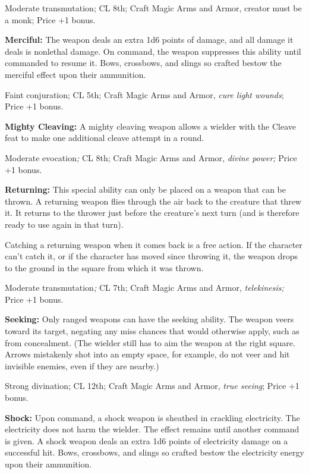 \documentclass{article}
\begin{document}
Moderate transmutation; CL 8th; Craft Magic Arms and Armor, creator must be a monk; 
Price +1 bonus.

\textbf{Merciful: }The weapon deals an extra 1d6 points of damage, and all damage 
it deals is nonlethal damage. On command, the weapon suppresses this ability until 
commanded to resume it. Bows, crossbows, and slings so crafted bestow the merciful 
effect upon their ammunition.

Faint conjuration; CL 5th; Craft Magic Arms and Armor, \textit{cure light wounds}; 
Price +1 bonus.

\textbf{Mighty Cleaving:} A mighty cleaving weapon allows a wielder with the Cleave 
feat to make one additional cleave attempt in a round.

Moderate evocation\textit{; }CL 8th; Craft Magic Arms and Armor, \textit{divine 
power; }Price +1 bonus.

\textbf{Returning:} This special ability can only be placed on a weapon that can 
be thrown. A returning weapon flies through the air back to the creature that threw 
it. It returns to the thrower just before the creature's next turn (and is therefore 
ready to use again in that turn).

Catching a returning weapon when it comes back is a free action. If the character 
can't catch it, or if the character has moved since throwing it, the weapon drops 
to the ground in the square from which it was thrown.

Moderate transmutation\textit{; }CL 7th; Craft Magic Arms and Armor, \textit{telekinesis; 
}Price +1 bonus.

\textbf{Seeking:} Only ranged weapons can have the seeking ability. The weapon 
veers toward its target, negating any miss chances that would otherwise apply, 
such as from concealment. (The wielder still has to aim the weapon at the right 
square. Arrows mistakenly shot into an empty space, for example, do not veer and 
hit invisible enemies, even if they are nearby.)

Strong divination; CL 12th; Craft Magic Arms and Armor, \textit{true seeing}; Price 
+1 bonus.

\textbf{Shock:} Upon command, a shock weapon is sheathed in crackling electricity. 
The electricity does not harm the wielder. The effect remains until another command 
is given. A shock weapon deals an extra 1d6 points of electricity damage on a successful 
hit. Bows, crossbows, and slings so crafted bestow the electricity energy upon 
their ammunition.
\end{document}
